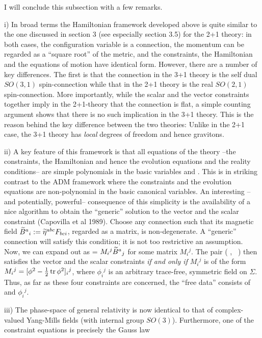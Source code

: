 \medskip
I will conclude this subsection with a few remarks.
\item{i)} In broad terms the Hamiltonian framework developed above
is quite similar to the one discussed in section 3 (see especially
section 3.5) for the 2+1 theory:
in both cases, the configuration variable is a connection, the momentum
can be regarded as a ``square root'' of the metric, and the constraints,
the Hamiltonian and the equations of motion have identical form. However,
there are a number of key differences. The first is that the connection
in the 3+1 theory is the self dual $SO(3,1)$ spin-connection while that in
the 2+1 theory is the real $SO(2,1)$ spin-connection. More importantly, while
the scalar and the vector constraints together imply in the 2+1-theory
that the connection is flat, a simple counting argument shows that there is
no such implication in the 3+1 theory. This is the reason behind the key
difference between the two theories: Unlike in the 2+1 case, the 3+1 theory
has {\it local} degrees of freedom and hence gravitons.
\item{ii)} A key feature of this framework is that all equations of the
theory --the constraints, the Hamiltonian and hence the evolution equations
and the reality conditions-- are simple polynomials in the basic variables
\E\- and \A . This is in striking contrast to the ADM framework where the
constraints and the evolution equations are non-polynomial in the basic
canonical variables. An interesting --and potentially, powerful--
consequence of this simplicity is the availability of a nice algorithm to
obtain the ``generic'' solution to the vector and the scalar constraint
(Capovilla et al 1989). Choose any connection \A\- such that its magnetic
field $\widetilde B^a{}_i := \widetilde\eta^{abc} F_{bci}$, regarded as a matrix, is
non-degenerate. A ``generic'' connection \A\- will satisfy this condition;
it is not too restrictive an assumption.  Now, we can expand out \E\- as
\E = $M_i{}^j \widetilde B^a{}_j$ for some matrix $M_i{}^j$. The pair (\A\- , \E\ )
then satisfies the vector and the scalar constraints {\it if and only if}
$M_i{}^j$ is of the form $M_i{}^j = [\phi^2 -\textstyle{1\over 2} \mathop{\rm tr}
\phi^2 ]_i{}^j$, where $\phi_i{}^j$ is an arbitrary trace-free, symmetric
field on $\Sigma$. Thus, as far as these four constraints are concerned,
the ``free data'' consists of \A\- and $\phi_i{}^j$.
\item{iii)} The phase-space of general relativity is now identical to
that of complex-valued Yang-Mills fields (with internal group $SO(3)$).
Furthermore, one of the constraint equations is precisely the Gauss law
